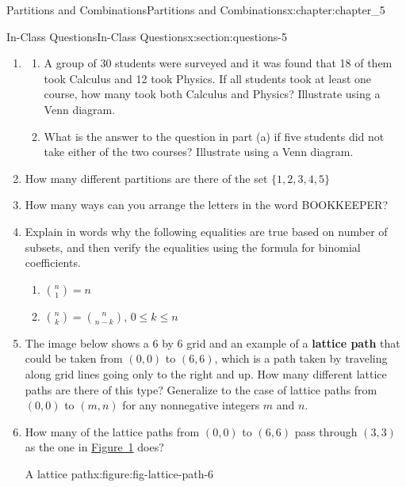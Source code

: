 \documentclass[oneside,10pt,]{book}
\newcommand{\terminology}[1]{\textbf{#1}}
\numberwithin{equation}{section}
\begin{document}
\begin{chapterptx}{Partitions and Combinations}{}{Partitions and Combinations}{}{}{x:chapter:chapter_5}
%
%
\typeout{************************************************}
\typeout{************************************************}
%
\begin{sectionptx}{In-Class Questions}{}{In-Class Questions}{}{}{x:section:questions-5}
%
\begin{enumerate}[label=\arabic*.]
\item{}%
\begin{enumerate}[label=(\alph*)]
\item{}A group of 30 students were surveyed and it was found that 18 of them took Calculus and 12 took Physics. If all students took at least one course, how many took both Calculus and Physics? Illustrate using a Venn diagram.%
\item{}What is the answer to the question in part (a) if five students did not take either of the two courses? Illustrate using a Venn diagram.%
\end{enumerate}
%
\item{}How many different partitions are there of the set \(\{1,2,3,4,5\}\)%
\item{}How many ways can you arrange the letters in the word BOOKKEEPER?%
\item{}Explain in words why the following equalities are true based on number of subsets,  and then verify the equalities using the formula for binomial coefficients.%
\par
%
\begin{enumerate}[label=(\alph*)]
\item{}\(\binom{n}{1} = n\)%
\item{}\(\binom{n}{k} = \binom{n}{n-k}\), \(0 \leq k \leq n\)%
\end{enumerate}
%
\item{}The image below shows a 6 by 6 grid and an example of a \terminology{lattice path} that could be taken from \((0,0)\)  to \((6,6)\), which is a path taken by traveling along grid lines going only to the right and up. How many different lattice paths are there of this type?  Generalize to the case of lattice paths from \((0,0)\) to \((m,n)\)  for any nonnegative integers \(m\) and \(n\).%
\item{}How many of the lattice paths from \((0,0)\) to \((6,6)\) pass through \((3,3)\) as the one in \hyperref[x:figure:fig-lattice-path-6]{Figure~1} does?%
\begin{figureptx}{A lattice path}{x:figure:fig-lattice-path-6}{}%
\begin{image}{0.25}{0.5}{0.25}%

\end{image}
\end{figureptx}
\end{enumerate}
\end{sectionptx}
\end{chapterptx}
\end{document}

